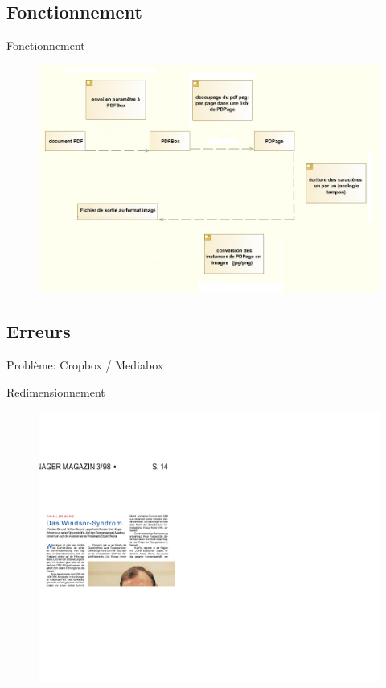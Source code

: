 \subsection{Fonctionnement}
\begin{frame}{Fonctionnement}
		\begin{figure}[h]
			\begin{center}
 			\includegraphics[scale=0.40]{images/pdfboxTraitement.png} 
			\end{center}
    		\end{figure}
\end{frame}

\subsection{Erreurs}
\begin{frame}{Problème: Cropbox / Mediabox}
	\begin{block}{Redimensionnement}
		\begin{figure}[h]
        		\begin{center}
         		\includegraphics[scale=0.08]{images/fail1.jpg} 
        		\end{center}
    		\end{figure}
	\end{block}
\end{frame}

